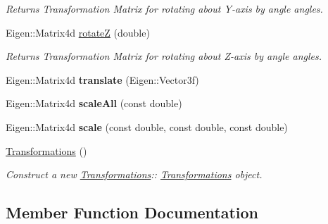 \begin{DoxyCompactItemize}
\begin{DoxyCompactList}\small\item\em Returns Transformation Matrix for rotating about Y-\/axis by \textquotesingle{}angle\textquotesingle{} angles. \end{DoxyCompactList}\item 
Eigen\+::\+Matrix4d \hyperlink{classTransformations_af700b3a14795f2483e73dac667138907}{rotateZ} (double)
\begin{DoxyCompactList}\small\item\em Returns Transformation Matrix for rotating about Z-\/axis by \textquotesingle{}angle\textquotesingle{} angles. \end{DoxyCompactList}\item 
\mbox{\label{classTransformations_a08b9bf1b52ccec63d34f44a21368edde}} 
Eigen\+::\+Matrix4d {\bfseries translate} (Eigen\+::\+Vector3f)
\item 
\mbox{\label{classTransformations_a0948151585af910e7bd2c6734ecf9d5b}} 
Eigen\+::\+Matrix4d {\bfseries scale\+All} (const double)
\item 
\mbox{\label{classTransformations_a43c9ba3fcb9d8fb440f3a686b8a99434}} 
Eigen\+::\+Matrix4d {\bfseries scale} (const double, const double, const double)
\item 
\mbox{\label{classTransformations_a3dddecc6c02addaaa804e0c3ebb8163f}} 
\hyperlink{classTransformations_a3dddecc6c02addaaa804e0c3ebb8163f}{Transformations} ()
\begin{DoxyCompactList}\small\item\em Construct a new \hyperlink{classTransformations}{Transformations}\+:\+: \hyperlink{classTransformations}{Transformations} object. \end{DoxyCompactList}\end{DoxyCompactItemize}


\subsection{Member Function Documentation}
\mbox{\label{classTransformations_a9d470736a0a55415259c9eea0bf8a2e0}} 
